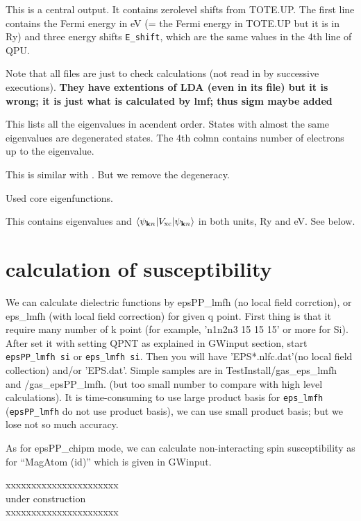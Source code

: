\documentclass[a4paper,10pt,epsf,fleqn]{article}
\begin{document}
This is a central output.
It contains zerolevel shifts from {\sf TOTE.UP}.
The first line contains the Fermi energy in eV 
(= the Fermi energy in {\sf TOTE.UP} but it is in Ry)
and three energy shifts {\tt E\_shift}, which are the same values in the 4th line of {\sf QPU}.

\vspace{1cm}

Note that all  files are just to check calculations
(not read in by successive executions).
{\bf They have extentions of LDA (even in its file)
but it is wrong; it is just what is calculated by lmf;
thus sigm maybe added}

This lists all the eigenvalues in acendent order.
States with almost the same eigenvalues are degenerated states.
The 4th colmn contains number of electrons up to the eigenvalue.

This is similar with .
But we remove the degeneracy.

Used core eigenfunctions.

This contains eigenvalues and 
$\langle \psi_{{\bf k} n} |V_{\rm xc} |\psi_{{\bf k} n}\rangle$
in both units, Ry and eV. See below.


\section{calculation of susceptibility}
We can calculate dielectric functions by epsPP\_lmfh (no local field
corrction), or eps\_lmfh (with local field correction) for given q
point. First thing is that it require many number of k point 
(for example, 'n1n2n3 15 15 15' or more for Si).
After set it with setting QPNT as explained in GWinput section,
start \verb+epsPP_lmfh si+ or \verb+eps_lmfh si+. Then you will have
'EPS*.nlfc.dat'(no local field collection) and/or 'EPS.dat'.
Simple samples are in TestInstall/gas\_eps\_lmfh and /gas\_epsPP\_lmfh. 
(but too small number to compare with high level calculations). It is time-consuming to use large
product basis for \verb+eps_lmfh+ (\verb+epsPP_lmfh+ do not use product
basis), we can use small product basis; but we lose not so much
accuracy.

As for epsPP\_chipm mode, we can calculate non-interacting 
spin susceptibility as for ``MagAtom (id)'' which is given in GWinput.


xxxxxxxxxxxxxxxxxxxxxx\\
  under construction \\
xxxxxxxxxxxxxxxxxxxxxx\\
\end{document}
